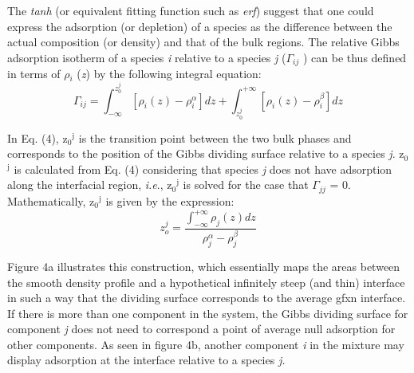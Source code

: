 \documentclass{scrbook}
\begin{document}
The \textit{tanh} (or equivalent fitting function such as \textit{erf}) suggest
that one could express the adsorption (or depletion) of a species as the
difference between the actual composition (or density) and that of the bulk
regions. The relative Gibbs adsorption isotherm of a species \textit{i}
relative to a species \textit{j} (${\Gamma}$$_{ij}$ ) can be thus defined in
terms of ${\rho}$$_{i}$ (\textit{z}) by the following integral
equation\citep{evans1992}:
\begin{equation}
\varGamma_{ij}=\int_{-\infty}^{z_{0}^{j}}\left[\rho_{i}\left(z\right)-\rho{}_{i}^{\alpha}\right]dz+\int_{z_{0}^{j}}^{+\infty}\left[\rho_{i}\left(z\right)-\rho{}_{i}^{\beta}\right]dz
\end{equation}

In Eq. (4), z$_{0}$$^{\mathrm{j}}$ is the transition point between the two bulk
phases and corresponds to the position of the Gibbs dividing surface relative
to a species \textit{j}. z$_{0}$$^{\mathrm{j}}$ is calculated from Eq. (4)
considering that species \textit{j} does not have adsorption along the
interfacial region, \textit{i.e}., z$_{0}$$^{\mathrm{j}}$ is solved for the
case that ${\Gamma}$$_{jj}$ = 0. Mathematically, z$_{0}$$^{\mathrm{j}}$ is
given by the expression:
\begin{equation}
z_{o}^{j}=\frac{\int_{-\infty}^{+\infty}\rho_{j}\left(z\right)dz}{\rho_{j}^{\alpha}-\rho_{j}^{\beta}}
\end{equation}

Figure 4a illustrates this construction, which essentially maps the areas
between the smooth density profile and a hypothetical infinitely steep (and
thin) interface in such a way that the dividing surface corresponds to the
average gfxn interface. If there is more than one component in the system, the
Gibbs dividing surface for component \textit{j} does not need to correspond
a point of average null adsorption for other components. As seen in figure 4b,
another component \textit{i} in the mixture may display adsorption at the
interface relative to a species \textit{j.}
\end{document}
